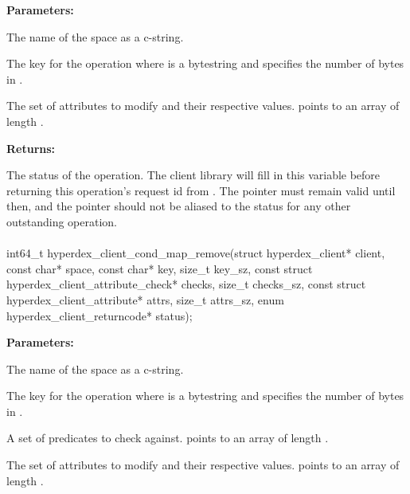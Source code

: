 \noindent\textbf{Parameters:}
\begin{description}[labelindent=\widthof{{\code{attrs}, \code{attrs\_sz}}},leftmargin=*,noitemsep,nolistsep,align=right]
\item[\code{space}] The name of the space as a c-string.
\item[\code{key}, \code{key\_sz}] The key for the operation where  is a bytestring and  specifies the number of bytes in .
\item[\code{attrs}, \code{attrs\_sz}] The set of attributes to modify and their respective values.   points to an array of length .
\end{description}

\noindent\textbf{Returns:}
\begin{description}[labelindent=\widthof{{\code{status}}},leftmargin=*,noitemsep,nolistsep,align=right]
\item[\code{status}] The status of the operation.  The client library will fill in this variable before returning this operation's request id from .  The pointer must remain valid until then, and the pointer should not be aliased to the status for any other outstanding operation.
\end{description}

\paragraph{}
\begin{ccode}
int64_t hyperdex_client_cond_map_remove(struct hyperdex_client* client,
                const char* space,
                const char* key, size_t key_sz,
                const struct hyperdex_client_attribute_check* checks, size_t checks_sz,
                const struct hyperdex_client_attribute* attrs, size_t attrs_sz,
                enum hyperdex_client_returncode* status);
\end{ccode}
\funcdesc 

\noindent\textbf{Parameters:}
\begin{description}[labelindent=\widthof{{\code{checks}, \code{checks\_sz}}},leftmargin=*,noitemsep,nolistsep,align=right]
\item[\code{space}] The name of the space as a c-string.
\item[\code{key}, \code{key\_sz}] The key for the operation where  is a bytestring and  specifies the number of bytes in .
\item[\code{checks}, \code{checks\_sz}] A set of predicates to check against.   points to an array of length .
\item[\code{attrs}, \code{attrs\_sz}] The set of attributes to modify and their respective values.   points to an array of length .
\end{description}

